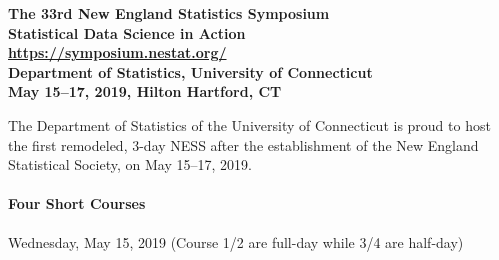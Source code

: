 \documentclass[12pt]{article}
\begin{document}
\pagestyle{empty}


\noindent{}%
\begin{minipage}[m]{5.5in}
\begin{center}
{\bf\Large  The 33rd New England Statistics Symposium\\[8pt]
 Statistical Data Science in Action}\\[8pt]
{\bf\large \url{https://symposium.nestat.org/}}\\[6pt]
{\bf\large Department of Statistics, University of Connecticut}\\[4pt]
{\bf May 15--17, 2019, Hilton Hartford, CT}
\end{center}
\end{minipage}

The Department of Statistics of the University of Connecticut is proud to host the first remodeled, 3-day NESS after the establishment of the New England Statistical Society, on May 15–17, 2019.

\paragraph{Four Short Courses}
Wednesday, May 15, 2019 (Course 1/2 are full-day while 3/4 are half-day)

\end{document}
